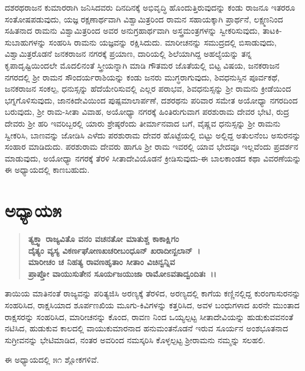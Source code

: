 ದಶರಥರಾಜನ ಕುಮಾರರಾಗಿ ಜನಿಸಿದವರು ದಿನದಿನಕ್ಕೆ ಅಭಿವೃದ್ಧಿ ಹೊಂದುತ್ತಿರುವುದನ್ನು ಕಂಡು ರಾಜನೂ ಇತರರೂ ಸಂತೋಷಪಡುವುದು, ಯಜ್ಞ ರಕ್ಷಣಾರ್ಥವಾಗಿ ವಿಶ್ವಾಮಿತ್ರರಿಂದ ರಾಮನ ಸಹಾಯಕ್ಕಾಗಿ ಪ್ರಾರ್ಥನೆ, ಲಕ್ಷ್ಮಣನಿಂದ ಸಹಿತನಾದ ರಾಮನು ವಿಶ್ವಾಮಿತ್ರರಿಂದ ಅವರ ಅನುಗ್ರಹಾರ್ಥವಾಗಿ ಅಸ್ತ್ರಮಂತ್ರಗಳನ್ನು ಸ್ವೀಕರಿಸುವುದು, ತಾಟಕಿ-ಸುಬಾಹುಗಳನ್ನು ಸಂಹರಿಸಿ ರಾಮನು ಯಜ್ಞವನ್ನು ರಕ್ಷಿಸಿದುದು. ಮಾರೀಚನನ್ನು ಸಮುದ್ರದಲ್ಲಿ ಬಿಸಾಡುವುದು, ವಿಶ್ವಾಮಿತ್ರರೊಡನೆ ಜನಕರಾಜನ ನಗರಕ್ಕೆ ಪ್ರಯಾಣ, ದಾರಿಯಲ್ಲಿ ಶಿಲೆಯಾಗಿದ್ದ ಅಹಲ್ಯೆಯನ್ನು ತನ್ನ ಕೃಪಾದೃಷ್ಟಿಯಿಂದಲೇ ಮೊದಲಿನಂತೆ ಸ್ತ್ರೀಯನ್ನಾಗಿ ಮಾಡಿ ಗೌತಮರ ಜೊತೆಯಲ್ಲಿ ಬಿಟ್ಟ ವಿಷಯ, ಜನಕರಾಜನ ನಗರದಲ್ಲಿ ಶ‍್ರೀ ರಾಮನ ಸೌಂದರ್ಯರಾಶಿಯನ್ನು ಕಂಡು ಜನರು ಮುಗ್ಧರಾಗುವುದು, ಶಿವಧನುಸ್ಸಿನ ಪೂರ್ವಕಥೆ, ಜನಕರಾಜನ ಸಂಕಲ್ಪ, ಧನುಸ್ಸನ್ನು ಹೆದೆಯೇರಿಸುವಲ್ಲಿ ಎಲ್ಲರ ಪರಾಭವ, ಶಿವಧನುಸ್ಸನ್ನು ಶ‍್ರೀ ರಾಮನು ಕ್ರೀಡೆಯಿಂದ ಭಗ್ನಗೊಳಿಸುವುದು, ಜಾನಕಿದೇವಿಯಿಂದ ಪುಷ್ಪಮಾಲಾರ್ಪಣೆ, ದಶರಥನು ಪರಿವಾರ ಸಮೇತ ಅಯೋಧ್ಯಾ ನಗರದಿಂದ ಬರುವುದು, ಶ‍್ರೀ ರಾಮ-ಸೀತಾ ವಿವಾಹ, ಅಯೋಧ್ಯಾ ನಗರಕ್ಕೆ ಹಿಂತಿರುಗುವಾಗ ಪರಶುರಾಮ ದೇವರ ಭೇಟಿ, ರುದ್ರ ದೇವರು ಶ‍್ರೀ ಹರಿ ಇವರಿಬ್ಬರಲ್ಲಿ ಯಾರು ಶ್ರೇಷ್ಠರೆಂದು ತೀರ್ಮಾನವಾದ ಬಗೆ, ವೈಷ್ಣವ ಧನುಸ್ಸನ್ನು ಶ‍್ರೀ ರಾಮನು ಸ್ವೀಕರಿಸಿ, ಬಾಣವನ್ನು ಜೋಡಿಸಿ ಎಳೆದು ಪರಶುರಾಮ ದೇವರ ಹೊಟ್ಟೆಯಲ್ಲಿ ಬಿಟ್ಟು ಅಲ್ಲಿದ್ದ ಅತುಲನೆಂಬ ಅಸುರನನ್ನು ಸಂಹಾರ ಮಾಡಿದುದು. ಪರಶುರಾಮ ದೇವರು ಹಾಗೂ ಶ‍್ರೀ ರಾಮ ಇವರಲ್ಲಿ ಯಾವ ಭೇದವೂ ಇಲ್ಲವೆಂದು ಪ್ರದರ್ಶನ ಮಾಡುವುದು, ಅಯೋಧ್ಯಾ ನಗರಕ್ಕೆ ತೆರಳಿ ಸೀತಾದೇವಿಯೊಡನೆ ಕ್ರೀಡಿಸುವುದು-ಈ ಬಾಲಕಾಂಡದ ಕಥಾ ವಿವರಣೆಯನ್ನು ಈ ಅಧ್ಯಾಯದಲ್ಲಿ ಕಾಣಬಹುದು.


\section*{ಅಧ್ಯಾಯ\enginline{-}೫}

\begin{verse}
\textbf{ತ್ಯಕ್ತ್ವಾ ರಾಜ್ಯವಿತೊ ವನಂ ವಚನತೋ ಮಾತುಶ್ಚ ಕಾಕಾಕ್ಷಿಗಂ} \\\textbf{ದೈತ್ಯಂ ವ್ಯಸ್ಯ ವಿಕರ್ಣಘೋಣಖಚರೀಬಂಧೂನ್ ಖರಾದೀನ್ಖಲಾನ್~।}\\\textbf{ಮಾರೀಚಂ ಚ ನಿಹತ್ಯ ರಾವಣಹೃತಾಂ ಸೀತಾಂ ವಿಚಿನ್ವನ್ನಿವ} \\\textbf{ಪ್ರಾಪ್ತೋ ವಾಯುಸುತೇನ ಸೂರ್ಯಜಯುಜಾ ರಾಮೋಽವತಾದ್ವಂದಿತಃ~।।}
\end{verse}

ತಾಯಿಯ ಮಾತಿನಂತೆ ರಾಜ್ಯವನ್ನು ಪರಿತ್ಯಜಿಸಿ ಅರಣ್ಯಕ್ಕೆ ತೆರಳಿದ, ಅರಣ್ಯದಲ್ಲಿ ಕಾಗೆಯ ಕಣ್ಣಿನಲ್ಲಿದ್ದ ಕುರಂಗಾಸುರನನ್ನು ಸಂಹರಿಸಿದ, ರಾಕ್ಷಸಿಯಾದ ಶೂರ್ಪಣಖಿಯ ಮೂಗು-ಕಿವಿಗಳನ್ನು ಕತ್ತರಿಸಿದ, ಅವಳ ಬಂಧುಗಳಾದ ಖರನೇ ಮುಂತಾದ ರಾಕ್ಷಸರನ್ನು ಸಂಹರಿಸಿದ, ಮಾರೀಚನನ್ನು ಕೊಂದ, ರಾವಣ ನಿಂದ ಒಯ್ಯಲ್ಪಟ್ಟ ಸೀತಾದೇವಿಯನ್ನು ಹುಡುಕುವವನಂತೆ ನಟಿಸಿದ, ಹುಡುಕುವ ಕಾಲದಲ್ಲಿ ವಾಯುಕುಮಾರನಾದ ಹನುಮಂತನೊಡನೆ ಇರುವ ಸೂರ್ಯನ ಅಂಶಭೂತನಾದ ಸುಗ್ರೀವನನ್ನು ಭೇಟಿಮಾಡಿದ, ನಂತರ ಅವರಿಂದ ನಮಸ್ಕರಿಸಿ ಕೊಳ್ಳಲ್ಪಟ್ಟ ಶ‍್ರೀರಾಮನು ನಮ್ಮನ್ನು ಸಲಹಲಿ.

ಈ ಅಧ್ಯಾಯದಲ್ಲಿ ೫೧ ಶ್ಲೋಕಗಳಿವೆ.

